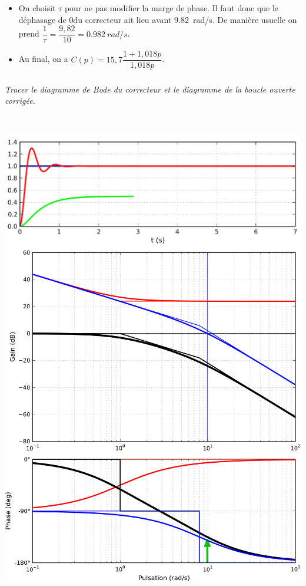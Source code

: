 \documentclass[10pt,fleqn]{article} %
\begin{document}
\begin{multicols}{2}
\begin{corrige}
\begin{itemize}
\item On choisit $\tau$ pour ne pas modifier la marge de phase. Il faut donc que le déphasage de 0\degres du correcteur ait lieu  avant \SI{9,82}{rad/s}. De manière usuelle on prend $\dfrac{1}{\tau}=\dfrac{9,82}{10}=\SI{0,982}{rad/s}$.

\item Au final, on a $C(p)=15,7\dfrac{1+1,018p}{1,018p}$.
\end{itemize}

\end{corrige}
\else\fi

\subparagraph{}\textit{Tracer le diagramme de Bode du correcteur et le diagramme de la boucle ouverte corrigée.}

\ifprof
\begin{corrige}~\\
\begin{center}
\includegraphics[width=\linewidth]{images/PI_corrige.png}
\includegraphics[width=\linewidth]{images/PI_BodeC.png}
\end{center}
\end{corrige}
\else
\fi



\end{multicols}
\end{document}
